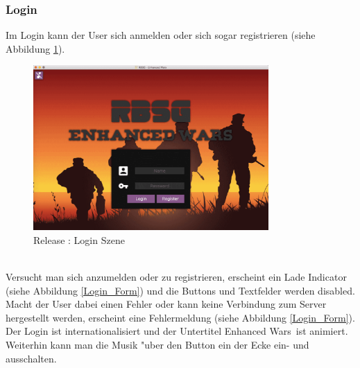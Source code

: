 \documentclass[12pt, titlepage]{scrartcl}
\newcommand{\RN}[1]{%
	\textup{\uppercase\expandafter{\romannumeral#1}}%
}
\begin{document}
            \subsubsection{Login}
                Im Login kann der User sich anmelden oder sich sogar registrieren (siehe Abbildung \ref{Login}). \\
                \begin{figure}[H] 
    				\centering
    				\includegraphics[width=0.8\textwidth]{images/old_state/login/Login.png}
    				\caption{Release \RN{2}: Login Szene}
    				\label{Login}
			    \end{figure}
			    \ \\ Versucht man sich anzumelden oder zu registrieren, erscheint ein Lade Indicator (siehe Abbildung \ref{Login_Form}) und die Buttons und Textfelder werden disabled. Macht der User dabei einen Fehler oder kann keine Verbindung zum Server hergestellt werden, erscheint eine Fehlermeldung (siehe Abbildung \ref{Login_Form}). Der Login ist internationalisiert und der Untertitel \glqq Enhanced Wars\grqq\ ist animiert. Weiterhin kann man die Musik "uber den Button ein der Ecke ein- und ausschalten. \\
\end{document}
